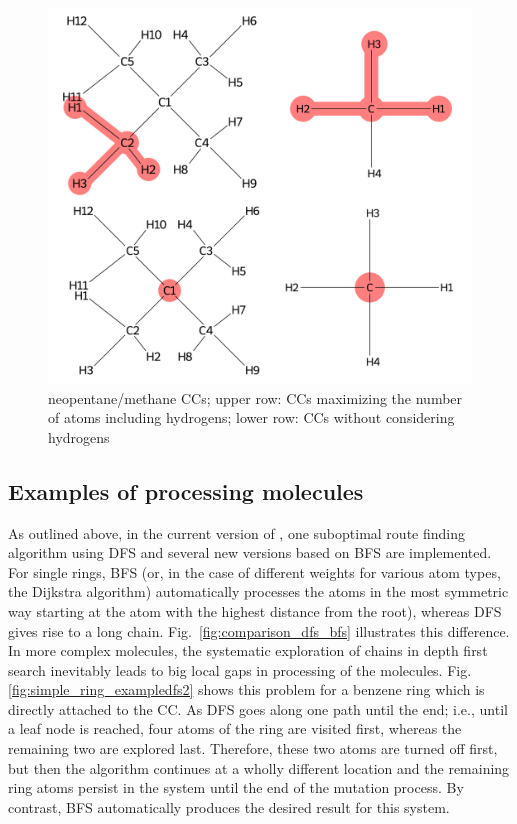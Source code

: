 \begin{figure}
	\includegraphics[scale=0.55]{neopentan_new}
	
	\caption{neopentane/methane CCs; upper row: CCs maximizing the number of atoms including hydrogens; lower row: CCs without considering hydrogens }
		\label{fig:neopentan}
\end{figure}



\subsection{Examples of processing molecules}

As outlined above, in the current version of {\trafo}, one suboptimal route finding algorithm using DFS and several new versions based on BFS are implemented.
For single rings, BFS (or, in the case of different weights for various atom types, the Dijkstra algorithm) automatically processes the atoms in the most symmetric way starting at the atom with the highest distance from the root), whereas DFS gives rise to a long chain. Fig.~\ref{fig:comparison_dfs_bfs} illustrates this difference.
In more complex molecules, the systematic exploration of chains in
depth first search inevitably leads to big local gaps in processing
of the molecules. Fig. \ref{fig:simple_ring_exampledfs2} shows this problem for a benzene ring which
is directly attached to the CC. As DFS goes along one path
until the end; i.e., until a leaf node is reached, four atoms of the
ring are visited first, whereas the remaining two are explored
last. Therefore, these two atoms are turned off first, but then the
algorithm continues at a wholly different location and the remaining
ring atoms persist in the system until the end of the mutation process.
By contrast, BFS automatically produces the desired result for this system. 


